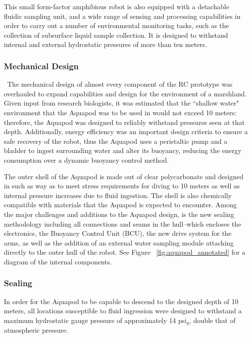 This small form-factor amphibious robot is also equipped with a detachable fluidic sampling unit, and a wide range of sensing and processing capabilities in order to carry out a number of environmental monitoring tasks, such as the collection of subsurface liquid sample collection.  It is designed to withstand internal and external hydrostatic pressures of more than ten meters. %


\subsubsection{Mechanical Design}\
The mechanical design of almost every component of the RC prototype was overhauled to expand capabilities and design for the environment of a marshland. Given input from research biologists, it was estimated that the ``shallow water" environment that the Aquapod was to be used in would not exceed 10 meters: therefore, the Aquapod was designed to reliably withstand pressures seen at that depth.  Additionally, energy efficiency was an important design criteria to ensure a safe recovery of the robot, thus the Aquapod uses a peristaltic pump and a bladder to ingest surrounding water and alter its buoyancy, reducing the energy consumption over a dynamic buoyancy control method.  %

The outer shell of the Aquapod is made out of clear polycarbonate and designed in such as way as to meet stress requirements for diving to 10 meters as well as internal pressure increases due to fluid ingestion. The shell is also chemically compatible with materials that the Aquapod is expected to encounter.  Among the major challenges and additions to the Aquapod design, is the new sealing methodology including all connections and seams in the hull--which encloses the electronics, the Buoyancy Control Unit (BCU), the new drive system for the arms, as well as the addition of an external water sampling module attaching directly to the outer hull of the robot. See Figure ~\ref{fig:aquapod_annotated} for a diagram of the internal components.  

\subsubsection{Sealing}
In order for the Aquapod to be capable to descend to the designed depth of 10 meters, all locations susceptible to fluid ingression were designed to withstand a maximum hydrostatic gauge pressure of approximately 14 psi\(_g\), double that of atmospheric pressure. 

